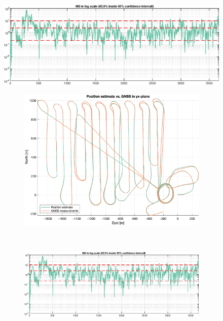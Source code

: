 \begin{figure}[!htb]
    \centering
    \includegraphics[width=0.8\linewidth]{figures/ga_2/real_consistency.eps}
    \caption{}
    \label{fig:ga_2_real_consistency}
\end{figure}

\begin{figure}[ht]
    \centering
	\begin{subfigure}[b]{0.45\textwidth}
		\includegraphics[width=\textwidth]{figures/ga_2/real_trajectory.eps}
    \caption{}
    \label{fig:ga_2_real_trajectory}
	\end{subfigure}%
       ~
	\begin{subfigure}[b]{0.45\textwidth}
		\includegraphics[width=\textwidth]{figures/ga_2/real_consistency.eps}
    \caption{}
    \label{fig:ga_2_real_consistency}
	\end{subfigure}
    \label{fig:ga_2_real_trajectory_consistency} 
\end{figure}